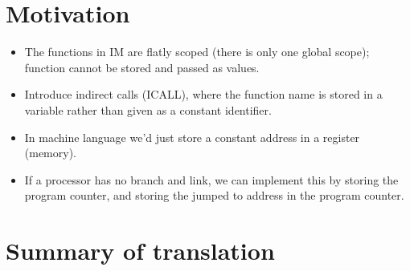 \tableofcontents

\begin{description}[\setleftmargin{20pt}\setlabelstyle{\bf}\breaklabel]

\item [lol]

\end{description}

\section{Motivation}

\begin{itemize}

\item The functions in IM are flatly scoped (there is only one global scope);
function cannot be stored and passed as values.

\item Introduce indirect calls (ICALL), where the function name is stored in a
variable rather than given as a constant identifier.

\item In machine language we'd just store a constant address in a register
(memory).

\item If a processor has no branch and link, we can implement this by storing
the program counter, and storing the jumped to address in the program counter.

\end{itemize}

\section{Summary of translation}

